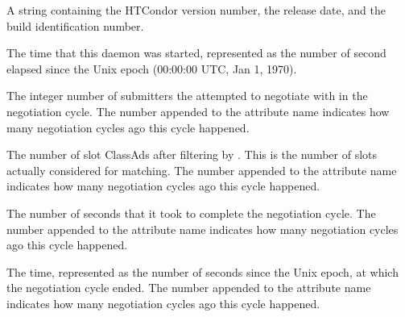 \begin{description}

\item[\AdAttr{CondorVersion}:] A string containing the HTCondor version
number, the release date, and the build identification number.

\item[\AdAttr{DaemonStartTime}:] The time that this daemon was
started, represented as the number of second elapsed since
the Unix epoch (00:00:00 UTC, Jan 1, 1970).

\label{attr:LastNegotiationCycleActiveSubmitterCount<X>}
\item[\AdAttr{LastNegotiationCycleActiveSubmitterCount<X>}:] 
The integer number of submitters
the  attempted to negotiate with in the negotiation cycle.
The number  appended to the attribute name indicates how
many negotiation cycles ago this cycle happened.

\label{attr:LastNegotiationCycleCandidateSlots<X>}
\item[\AdAttr{LastNegotiationCycleCandidateSlots<X>}:] 
The number of slot ClassAds after filtering by 
.
This is the number of slots actually considered for matching.
The number  appended to the attribute name indicates how many 
negotiation cycles ago this cycle happened.

\label{attr:LastNegotiationCycleDuration<X>}
\item[\AdAttr{LastNegotiationCycleDuration<X>}:] The number of seconds
that it took to complete the negotiation cycle.  The number 
appended to the attribute name indicates how many negotiation cycles
ago this cycle happened.

\label{attr:LastNegotiationCycleEnd<X>}
\item[\AdAttr{LastNegotiationCycleEnd<X>}:] 
The time, represented as the number of seconds since the Unix epoch,
at which the negotiation cycle ended. 
The number  appended to the attribute name 
indicates how many negotiation cycles ago this cycle happened.


\end{description}
